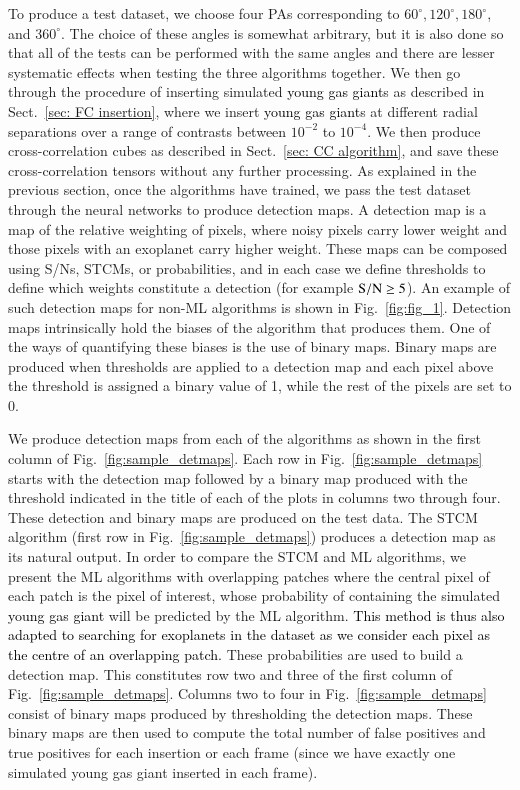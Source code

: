 \documentclass{aa}
\newcommand{\newchange}[1]{\textcolor{black}{#1}}
\begin{document}
To produce a test dataset, we choose four PAs corresponding to $60^{\circ},120^{\circ},180^{\circ}$, and $360^{\circ}$.
The choice of these angles is somewhat arbitrary, but it is also done so that all of the tests can be performed with the same angles and there are lesser systematic effects when testing the three algorithms together.
We then go through the procedure of inserting simulated \newchange{young gas giant}s as described in Sect.~\ref{sec: FC insertion}, where we insert \newchange{young gas giant}s at different radial separations over a range of contrasts between $10^{-2}$ to $10^{-4}$. We then produce cross-correlation cubes as described in Sect.~\ref{sec: CC algorithm}, and save these cross-correlation tensors without any further processing. As explained in the previous section, once the algorithms have trained, we pass the test dataset through the neural networks to produce detection maps.
A detection map is a map of the relative weighting of pixels, where noisy pixels carry lower weight and those pixels with an exoplanet carry higher weight.
These maps can be composed using S/Ns, STCMs, or probabilities, and in each case we define thresholds to define which weights constitute a detection (for example $\rm{S/N}\ge 5$).
An example of such detection maps for non-ML algorithms is shown in Fig.~\ref{fig:fig_1}.
Detection maps intrinsically hold the biases of the algorithm that produces them. %
One of the ways of quantifying these biases is the use of  binary maps.
Binary maps are produced when thresholds are applied to a detection map and each pixel above the threshold is assigned a binary value of 1, while the rest of the pixels are set to 0.

We produce detection maps from each of the algorithms as shown in the first column of Fig.~\ref{fig:sample_detmaps}.
Each row in Fig.~\ref{fig:sample_detmaps} starts with the detection map followed by a binary map produced with the threshold indicated in the title of each of the plots in columns two through four.
These detection and binary maps are produced on the test data.
The STCM algorithm (first row in Fig.~\ref{fig:sample_detmaps}) produces a detection map as its natural output.
In order to compare the STCM and ML algorithms, we present the ML algorithms with overlapping patches where the central pixel of each patch is the pixel of interest, whose probability of containing the simulated \newchange{young gas giant} will be predicted by the ML algorithm.
\newchange{This method is thus also adapted to searching for exoplanets in the dataset as we  consider each pixel as the centre of an overlapping patch.}
These probabilities are used to build a detection map.
This constitutes row two and three of the first column of Fig.~\ref{fig:sample_detmaps}.
Columns two to four in Fig.~\ref{fig:sample_detmaps} consist of binary maps produced by thresholding the detection maps.
These binary maps are then used to compute the total number of false positives and true positives for each insertion or each frame (since we have exactly one simulated young gas giant inserted in each frame).
\end{document}
